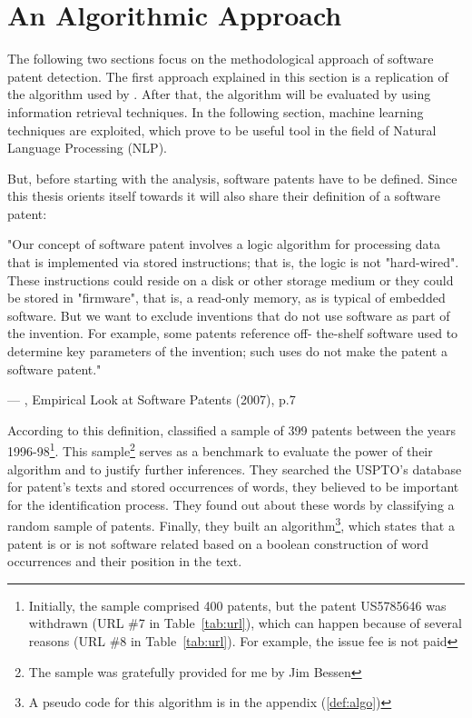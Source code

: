 \documentclass[12pt, a4paper]{scrartcl}
\theoremstyle{definition}
\begin{document}
\section{An Algorithmic Approach} %
\label{sub:an_algorithmic_approach}

The following two sections focus on the methodological approach of software
patent detection. The first approach explained in this section is a replication
of the algorithm used by \cite{bessen2007empirical}. After that, the algorithm
will be evaluated by using information retrieval techniques. In the following
section, machine learning techniques are exploited, which prove to be useful
tool in the field of Natural Language Processing (NLP).

But, before starting with the analysis, software patents have to be defined.
Since this thesis orients itself towards \cite{bessen2007empirical} it will
also share their definition of a software patent:

\epigraph{"Our concept of software patent involves a logic algorithm for
processing data that is implemented via stored instructions; that is, the logic
is not "hard-wired". These instructions could reside on a disk or other storage
medium or they could be stored in "firmware", that is, a read-only memory, as
is typical of embedded software. But we want to exclude inventions that do not
use software as part of the invention. For example, some patents reference off-
the-shelf software used to determine key parameters of the invention; such uses
do not make the patent a software patent."}{---
\textup{\citeauthor{bessen2007empirical}}, Empirical Look at Software Patents
(2007), p.7}

According to this definition, \citet[p.8]{bessen2007empirical} classified a
sample of 399 patents between the years 1996-98\footnote{Initially, the sample
comprised 400 patents, but the patent US5785646 was withdrawn (URL \#7 in
Table~\ref{tab:url}), which can happen because of several reasons (URL \#8 in
Table~\ref{tab:url}). For example, the issue fee is not paid}. This
sample\footnote{The sample was gratefully provided for me by Jim Bessen} serves
as a benchmark to evaluate the power of their algorithm and to justify further
inferences. They searched the USPTO's database for patent's texts and stored
occurrences of words, they believed to be important for the identification
process. They found out about these words by classifying a random sample of
patents. Finally, they built an algorithm\footnote{A pseudo code for this
algorithm is in the appendix (\ref{def:algo})}, which states that a patent is
or is not software related based on a boolean construction of word occurrences
and their position in the text.
\end{document}
